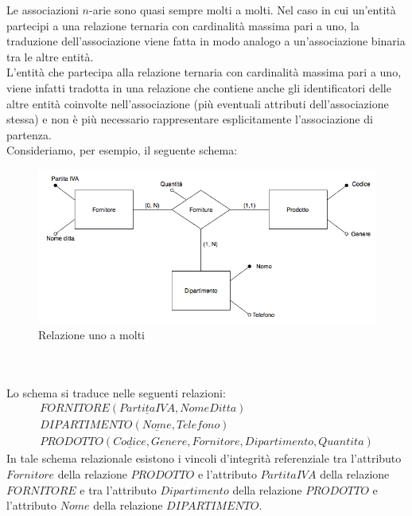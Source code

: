Le associazioni $n$-arie sono quasi sempre molti a molti. Nel caso in cui un'entità partecipi a una relazione ternaria con cardinalità massima pari a uno, la traduzione dell'associazione viene fatta in modo analogo a un'associazione binaria tra le altre entità.\\
L'entità che partecipa alla relazione ternaria con cardinalità massima pari a uno, viene infatti tradotta in una relazione che contiene anche gli identificatori delle altre entità coinvolte nell'associazione (più eventuali attributi dell'associazione stessa) e non è più necessario rappresentare esplicitamente l'associazione di partenza.\\
Consideriamo, per esempio, il seguente schema:
    \begin{figure}[h!]
        \centering
        \includegraphics[scale = 0.5]{15/img8b}
        \caption{Relazione uno a molti}
    \end{figure}\\\\
Lo schema si traduce nelle seguenti relazioni:
    \begin{equation}\begin{aligned}
        FORNITORE(\underline{PartitaIVA}, NomeDitta)\\
        DIPARTIMENTO(\underline{Nome}, Telefono)\\
        PRODOTTO(\underline{Codice}, Genere, Fornitore, Dipartimento, Quantita)
    \end{aligned}\end{equation}
In tale schema relazionale esistono i vincoli d'integrità referenziale tra l'attributo $Fornitore$ della relazione $PRODOTTO$ e l'attributo $PartitaIVA$ della relazione $FORNITORE$ e tra l'attributo $Dipartimento$ della relazione $PRODOTTO$ e l'attributo $Nome$ della relazione $DIPARTIMENTO$.    

